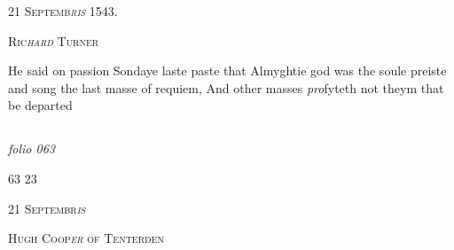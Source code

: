 \documentclass[12pt, a4paper]{book}
\begin{document}
            
            
               
				\begin{center} \begin{large} {\scshape 
                  21 Septemb\textit{ris} 1543.} \end{large} \end{center}
			
               
                  
				\begin{center}  {\scshape Ric\textit{hard} Turner}  \end{center}
			

               	
               		
		\ifthenelse{\isodd{\thepage}}
		{\reversemarginpar}
		{\normalmarginpar}
		 He said on passion Sondaye laste paste that
 Almyghtie god was the soule preiste and song
 the last masse of requiem, And other masses \textit{pro}fyteth
 not theym that be departed
               	


            
            
\dotfill
						\newpage {} \subsection*{}  \subsection*{}

\textit{folio 063}


\begin{flushright}{\color{Mahogany}63} 23\end{flushright}
 

               
				\begin{center} \begin{large} {\scshape 
                  21 Septembr\textit{is}
                  
               } \end{large} \end{center}
			
               
               	
				\begin{center}  {\scshape Hugh Coop\textit{er} of Tenterden}  \end{center}
			
\end{document}
